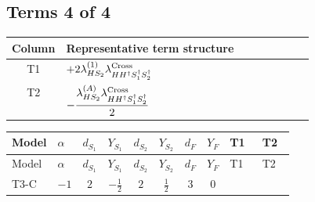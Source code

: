 \documentclass[8pt]{article}
\begin{document}
\begin{landscape}
\subsection*{Terms 4 of 4}
\begin{center}
\begin{tabular}{@{}c >{\raggedright\arraybackslash}p{0.82\linewidth}@{}}
\toprule
Column & Representative term structure \\
\midrule
T1 & \(\displaystyle +2 {\lambda_{HS_2}^{(1)}} {\lambda_{H H^\dagger S_1^\dagger S_2^\dagger}^{\rm Cross}}\) \\
\midrule
T2 & \(\displaystyle -\frac{{\lambda_{HS_2}^{(A)}} {\lambda_{H H^\dagger S_1^\dagger S_2^\dagger}^{\rm Cross}}}{2}\) \\
\midrule
\bottomrule
\end{tabular}
\end{center}
\smallskip
\tiny
\begin{longtable}{@{}llcccccc >{\raggedright\arraybackslash}p{0.21\linewidth} >{\raggedright\arraybackslash}p{0.21\linewidth}@{}}
\toprule
Model & $\alpha$ & $d_{S_1}$ & $Y_{S_1}$ & $d_{S_2}$ & $Y_{S_2}$ & $d_F$ & $Y_F$ & T1 & T2 \\
\midrule
\endfirsthead
\toprule
Model & $\alpha$ & $d_{S_1}$ & $Y_{S_1}$ & $d_{S_2}$ & $Y_{S_2}$ & $d_F$ & $Y_F$ & T1 & T2 \\
\midrule
\endhead
T3-C & $-1$ & $2$ & $-\frac{1}{2}$ & $2$ & $\frac{1}{2}$ & $3$ & $0$ & \scriptsize\adjustbox{max width=\linewidth}{$\begin{gathered} +2 {\lambda_{HS_2}^{(1)}} {\lambda_{H H^\dagger S_1^\dagger S_2^\dagger}^{\rm Cross}}\end{gathered}$} & \scriptsize\adjustbox{max width=\linewidth}{$\begin{gathered} -\frac{{\lambda_{HS_2}^{(A)}} {\lambda_{H H^\dagger S_1^\dagger S_2^\dagger}^{\rm Cross}}}{2}\end{gathered}$} \\
\midrule
\bottomrule
\end{longtable}
\end{landscape}
\end{document}
